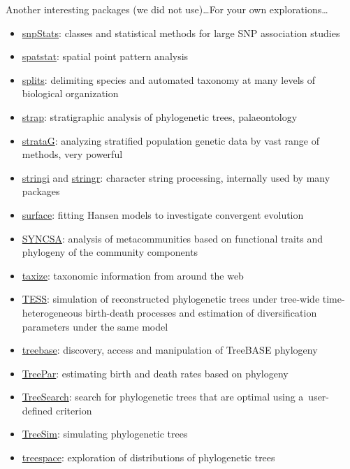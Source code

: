 \documentclass[compress, ucs, xelatex, 11pt, xcolor=svgnames,
	hyperref={
		bookmarks=true,
		unicode=true,
		colorlinks=true,
		pdftitle={Molecular data in R},
		plainpages=false,
		pdfauthor={Vojtech Zeisek},
		pdfsubject={Course about phylogeny and evolution in R},
		pdfcreator={XeLaTeX},
		pdfkeywords={R, evolution, phylogeny, molecular data},
		linkcolor=Tomato,
		anchorcolor=SaddleBrown,
		citecolor=Goldenrod,
		filecolor=DarkMagenta,
		menucolor=Sienna,
		urlcolor=DarkTurquoise,
		pdftex},
	url={hyphens, lowtilde} %
	]{beamer}
\begin{document}
\begin{frame}[allowframebreaks]{Another interesting packages (we did not use)\ldots}{For your own explorations\ldots}
\begin{itemize}
		\item \href{https://bioconductor.org/packages/release/bioc/html/snpStats.html}{snpStats}: classes and statistical methods for large SNP association studies
		\item \href{https://CRAN.R-project.org/package=spatstat}{spatstat}: spatial point pattern analysis
		\item \href{https://r-forge.r-project.org/projects/splits/}{splits}: delimiting species and automated taxonomy at many levels of biological organization
		\item \href{https://CRAN.R-project.org/package=strap}{strap}: stratigraphic analysis of phylogenetic trees, palaeontology
		\item \href{https://CRAN.R-project.org/package=strataG}{strataG}: analyzing stratified population genetic data by vast range of methods, very powerful
		\item \href{https://CRAN.R-project.org/package=stringi}{stringi} and \href{https://CRAN.R-project.org/package=stringr}{stringr}: character string processing, internally used by many packages
		\item \href{https://CRAN.R-project.org/package=surface}{surface}: fitting Hansen models to investigate convergent evolution
		\item \href{https://CRAN.R-project.org/package=SYNCSA}{SYNCSA}: analysis of metacommunities based on functional traits and phylogeny of the community components
		\item \href{https://CRAN.R-project.org/package=taxize}{taxize}: taxonomic information from around the web
		\item \href{https://CRAN.R-project.org/package=TESS}{TESS}: simulation of reconstructed phylogenetic trees under tree-wide time-heterogeneous birth-death processes and estimation of diversification parameters under the same model
		\item \href{https://CRAN.R-project.org/package=treebase}{treebase}:  discovery, access and manipulation of TreeBASE phylogeny
		\item \href{https://CRAN.R-project.org/package=TreePar}{TreePar}: estimating birth and death rates based on phylogeny
		\item \href{https://CRAN.R-project.org/package=TreeSearch}{TreeSearch}: search for phylogenetic trees that are optimal using a~user-defined criterion
		\item \href{https://CRAN.R-project.org/package=TreeSim}{TreeSim}: simulating phylogenetic trees
		\item \href{https://CRAN.R-project.org/package=treespace}{treespace}: exploration of distributions of phylogenetic trees

\end{itemize}
\end{frame}
\end{document}
